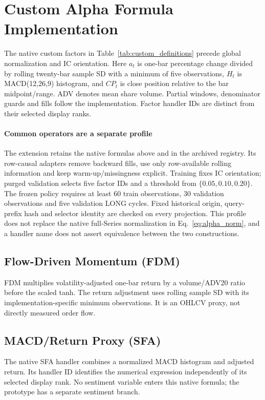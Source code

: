 \FloatBarrier
\setcounter{table}{0}
\section{Custom Alpha Formula Implementation}
\label{app:signals}
The native custom factors in Table~\ref{tab:custom_definitions} precede global normalization and IC orientation. Here $a_t$ is one-bar percentage change divided by rolling twenty-bar sample SD with a minimum of five observations, $H_t$ is MACD(12,26,9) histogram, and $CP_t$ is close position relative to the bar midpoint/range. ADV denotes mean share volume. Partial windows, denominator guards and fills follow the implementation. Factor handler IDs are distinct from their selected display ranks.


\paragraph{Common operators are a separate profile}
The extension retains the native formulas above and in the archived registry. Its row-causal adapters remove backward fills, use only row-available rolling information and keep warm-up/missingness explicit. Training fixes IC orientation; purged validation selects five factor IDs and a threshold from $\{0.05,0.10,0.20\}$. The frozen policy requires at least 60 train observations, 30 validation observations and five validation LONG cycles. Fixed historical origin, query-prefix hash and selector identity are checked on every projection. This profile does not replace the native full-Series normalization in Eq.~\ref{eq:alpha_norm}, and a handler name does not assert equivalence between the two constructions.

\subsection{Flow-Driven Momentum (FDM)}
FDM multiplies volatility-adjusted one-bar return by a volume/ADV20 ratio before the scaled tanh. The return adjustment uses rolling sample SD with its implementation-specific minimum observations. It is an OHLCV proxy, not directly measured order flow.

\subsection{MACD/Return Proxy (SFA)}
The native SFA handler combines a normalized MACD histogram and adjusted return. Its handler ID identifies the numerical expression independently of its selected display rank. No sentiment variable enters this native formula; the prototype has a separate sentiment branch.

